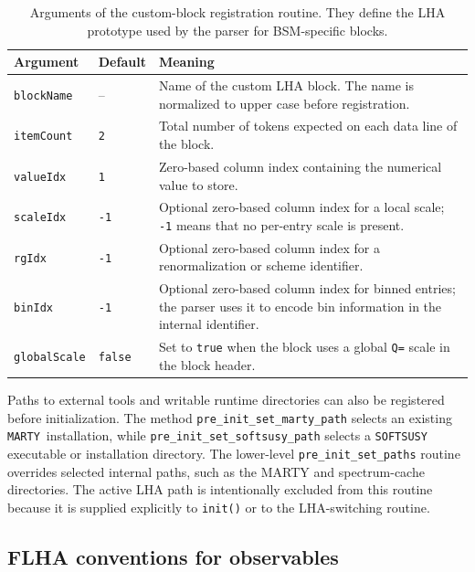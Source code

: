 \documentclass[preprint,11pt]{elsarticle}
\newcommand{\mty}{\texttt{MARTY}}
\begin{document}
\begin{table}[!ht]
\centering
\small
\renewcommand{\arraystretch}{1.15}
\begin{tabularx}{\textwidth}{@{}p{}p{}X@{}}
\toprule
\textbf{Argument} & \textbf{Default} & \textbf{Meaning} \\
\midrule
\texttt{blockName} & -- & Name of the custom LHA block.  The name is normalized to upper case before registration. \\
\texttt{itemCount} & \texttt{2} & Total number of tokens expected on each data line of the block. \\
\texttt{valueIdx} & \texttt{1} & Zero-based column index containing the numerical value to store. \\
\texttt{scaleIdx} & \texttt{-1} & Optional zero-based column index for a local scale; \texttt{-1} means that no per-entry scale is present. \\
\texttt{rgIdx} & \texttt{-1} & Optional zero-based column index for a renormalization or scheme identifier. \\
\texttt{binIdx} & \texttt{-1} & Optional zero-based column index for binned entries; the parser uses it to encode bin information in the internal identifier. \\
\texttt{globalScale} & \texttt{false} & Set to \texttt{true} when the block uses a global \texttt{Q=} scale in the block header. \\
\bottomrule
\end{tabularx}
\caption{Arguments of the custom-block registration routine.  They define the LHA prototype used by the parser for BSM-specific blocks.}
\label{tab:preinit_block_args}
\end{table}

Paths to external tools and writable runtime directories can also be registered before initialization.  The method \texttt{pre\_init\_set\_marty\_path} selects an existing \mty~installation, while \texttt{pre\_init\_set\_softsusy\_path} selects a \texttt{SOFTSUSY} executable or installation directory.  The lower-level \texttt{pre\_init\_set\_paths} routine overrides selected internal paths, such as the MARTY and spectrum-cache directories.  The active LHA path is intentionally excluded from this routine because it is supplied explicitly to \texttt{init()} or to the LHA-switching routine.

\subsection{FLHA conventions for observables}
\end{document}
